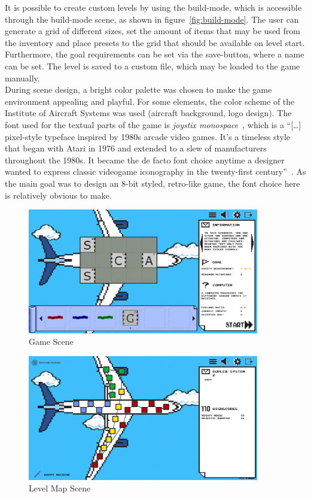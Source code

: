 It is possible to create custom levels by using the build-mode, which is accessible through the build-mode scene, as shown in figure~\ref{fig:build-mode}.
The user can generate a grid of different sizes, set the amount of items that may be used from the inventory and place presets to
the grid that should be available on level start.
Furthermore, the goal requirements can be set via the save-button, where a name can be set.
The level is saved to a custom file, which may be loaded to the game manually.
\\
During scene design, a bright color palette was chosen to make the game environment appealing and playful.
For some elements, the color scheme of the Institute of Aircraft Systems was used (aircraft background, logo design).
The font used for the textual parts of the game is \textit{joystix monospace}~\cite{joystix}, which is a ``[\ldots] pixel-style
typeface inspired by 1980s arcade video games.
It's a timeless style that began with Atari in 1976 and extended to a slew of manufacturers throughout the 1980s.
It became the de facto font choice anytime a designer wanted to express classic videogame iconography in the twenty-first century''~\cite{joystix}.
As the main goal was to design an 8-bit styled, retro-like game, the font choice here is relatively obvious to make.
\begin{figure}
    \centering
        \includegraphics[width=0.9\textwidth]{Pictures/res/implementation/scenes/game-scene}
    \caption{Game Scene}
    \label{fig:game-scene}
\end{figure}

\begin{figure}
    \centering
        \includegraphics[width=0.9\textwidth]{Pictures/res/implementation/scenes/level-map}
    \caption{Level Map Scene}
    \label{fig:level-scene}
\end{figure}


